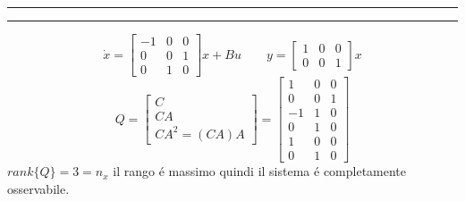 \documentclass[../main.tex]{subfiles}
\begin{document}
		\hrule
		\begin{Exercise}[title={Calcolare $ X_{NO} $}, difficulty=1]
		\hrule\medskip
			\[
				\dot x =
				\begin{bmatrix}
					-1 & 0 & 0\\
					0 & 0 & 1\\
					0 & 1 & 0
				\end{bmatrix} x + Bu
				\qquad
				y =
				\begin{bmatrix}
					1 & 0 & 0\\
					0 & 0 & 1
				\end{bmatrix} x
			\]
			\[
				Q =
				\begin{bmatrix}
					C\\
					CA\\
					CA^2 = (CA)A
				\end{bmatrix} =
				\begin{bmatrix}
					1 & 0 & 0\\
					0 & 0 & 1\\
					\hline
					-1 & 1 & 0\\
					0 & 1 & 0\\
					\hline
					1 & 0 & 0\\
					0 & 1 & 0
				\end{bmatrix}
			\]
			$ rank\{Q\} = 3 = n_x $ il rango \'e massimo quindi il sistema \'e completamente osservabile.
			

\end{Exercise}
\end{document}
